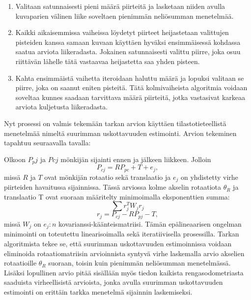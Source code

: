\documentclass[finnish]{tktltiki2}
\theoremstyle{definition}
\theoremstyle{remark}
\begin{document}
\begin{enumerate}
\item Valitaan satunnaisesti pieni määrä piirteitä ja lasketaan niiden avulla kuvaparien välinen liike soveltaen pienimmän neliösumman menetelmää.

\item Kaikki aikaisemmissa vaiheissa löydetyt piirteet heijastetaan valittujen pisteiden kanssa samaan kuvaan käyttäen hyväksi ensimmäisessä kohdassa saatua arviota liikeradasta. Jokainen satunnaisesti valittu piirre, joka osuu riittävän lähelle tätä vastaavaa heijastetta saa yhden pisteen.

\item Kahta ensimmäistä vaihetta iteroidaan haluttu määrä ja lopuksi valitaan se piirre, joka on saanut eniten pisteitä. Tätä kolmivaiheista algoritmia voidaan soveltaa kunnes saadaan tarvittava määrä piirteitä, jotka vastasivat karkeaa arviota kuljetusta liikeradasta.
\end{enumerate}

Nyt prosessi on valmis tekemään tarkan arvion käyttäen tilastotieteellistä menetelmää nimeltä suurimman uskottavuuden estimointi. Arvion tekeminen tapahtuu seuraavalla tavalla:

Olkoon $P_pj$ ja $Pcj$ mönkijän sijainti ennen ja jälkeen liikkeen. Jolloin
\[P_{cj} = RP_{pc} + T + e_j,\]
missä $R$ ja $T$ ovat mönkijän rotaatio sekä translaatio ja $e_j$ on yhdistetty virhe piirteiden havaitussa sijainnissa. Tässä arviossa kolme akselin rotaatiota $\theta_R$ ja translaatio T ovat suoraan määritelty minimoimalla eksponenttien summa:
\[\sum r^T_jW_jr_j\]
\[r_j = P_{cj}-RP_{pj}-T,\]
missä $W_j$ on $e_j:n$ kovarianssi-käänteismatriisi. Tämän epälineaarisen ongelman minimointi on toteutettu linearisoimalla sekä iteratiivisella prosessilla. Tarkan algoritmista tekee se, että suurimman uskottavuuden estimoinnissa voidaan eliminoida rotaatiomatriisin arvioinnista syntyvä virhe laskemalla arvio akselien rotaatioille $\theta_R$ suoraan, toisin kuin pienimmän neliösumman menetelmässä. Lisäksi lopullinen arvio pitää sisällään myös tiedon kaikista rengasodometriasta saaduista virheellisistä arvioista, jonka avulla suurimman uskottavuuden estimointi on erittäin tarkka menetelmä sijainnin laskemiseksi.

\cite{cheng2005visual}
\end{document}
